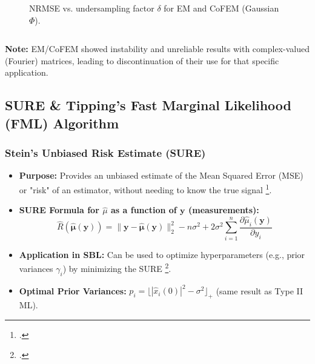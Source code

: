 \documentclass{beamer}
\begin{document}
\begin{frame}
\begin{columns}
\begin{column}{0.48\textwidth}
\begin{figure}[h!]
                \caption{NRMSE vs. undersampling factor $\delta$ for EM and CoFEM (Gaussian $\Phi$).}
            \end{figure}
        \end{column}
    \end{columns}
    \textbf{Note:} EM/CoFEM showed instability and unreliable results with complex-valued (Fourier) matrices, leading to discontinuation of their use for that specific application.
\end{frame}

\subsection{SURE \& Tipping's Fast Marginal Likelihood (FML) Algorithm}
\begin{frame}
    \frametitle{Stein's Unbiased Risk Estimate (SURE)}
    \begin{itemize}
        \item \textbf{Purpose:} Provides an unbiased estimate of the Mean Squared Error (MSE) or "risk" of an estimator, without needing to know the true signal \footcite{Tibshirani2015SteinS}.
        \item \textbf{SURE Formula for $\hat{\mu}$ as a function of $\mathbf{y}$ (measurements):}
        \begin{equation*}
            \widehat{R}(\hat{\boldsymbol{\mu}}(\mathbf{y})) = \|\mathbf{y} - \hat{\boldsymbol{\mu}}(\mathbf{y})\|_2^2 - n\sigma^2 + 2\sigma^2 \sum_{i=1}^n \frac{\partial \hat{\mu}_i(\mathbf{y})}{\partial y_i}
        \end{equation*}
        \item \textbf{Application in SBL:} Can be used to optimize hyperparameters (e.g., prior variances $\gamma_i$) by minimizing the SURE \footcite{slockSURE}.
        \item \textbf{Optimal Prior Variances:} $p_i = \lfloor|\hat{x}_i(0)|^2 - \sigma^2\rfloor_+$ (same result as Type II ML).
    \end{itemize}
\end{frame}
\end{document}
